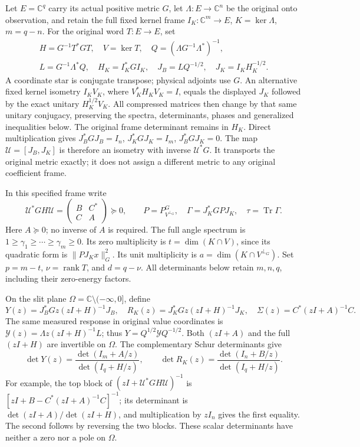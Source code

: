 \documentclass[10pt]{article}
\begin{document}
Let \(E=\mathbb C^q\) carry its actual positive metric \(G\), let \(\Lambda:E\to\mathbb C^n\) be the original onto observation, and retain the full fixed kernel frame \(I_K:\mathbb C^m\to E\), \(K=\ker\Lambda\), \(m=q-n\). For the original word \(T:E\to E\), set \[
\begin{gathered}
 H=G^{-1}T^*GT,\quad V=\ker T,\quad Q=(\Lambda G^{-1}\Lambda^*)^{-1},\\
 L=G^{-1}\Lambda^*Q,\quad H_K=I_K^*GI_K,\quad
 J_B=LQ^{-1/2},\quad J_K=I_KH_K^{-1/2}.
 \end{gathered}
 \tag{SF1}
\] A coordinate star is conjugate transpose; physical adjoints use \(G\). An alternative fixed kernel isometry \(I_KV_K\), where \(V_K^*H_KV_K=I\), equals the displayed \(J_K\) followed by the exact unitary \(H_K^{1/2}V_K\). All compressed matrices then change by that same unitary conjugacy, preserving the spectra, determinants, phases and generalized inequalities below. The original frame determinant remains in \(H_K\). Direct multiplication gives \(J_B^*GJ_B=I_n\), \(J_K^*GJ_K=I_m\), \(J_B^*GJ_K=0\). The map \(\mathcal U=[J_B,J_K]\) is therefore an isometry with inverse \(\mathcal U^*G\). It transports the original metric exactly; it does not assign a different metric to any original coefficient frame.

In this specified frame write \[
 \mathcal U^*GH\mathcal U=
 \begin{pmatrix}B&C^*\\ C&A\end{pmatrix}\succeq0,\qquad
 P=P_{V^{\perp_G}}^G,\quad \Gamma=J_K^*GPJ_K,\quad \tau=\operatorname{Tr}\Gamma.
 \tag{SF2}
\] Here \(A\succeq0\); no inverse of \(A\) is required. The full angle spectrum is \(1\ge\gamma_1\ge\cdots\ge\gamma_m\ge0\). Its zero multiplicity is \(t=\dim(K\cap V)\), since its quadratic form is \(\|PJ_Kx\|_G^2\). Its unit multiplicity is \(a=\dim(K\cap V^{\perp_G})\). Set \(p=m-t\), \(\nu=\operatorname{rank}T\), and \(d=q-\nu\). All determinants below retain \(m,n,q\), including their zero-energy factors.

On the slit plane \(\Omega=\mathbb C\setminus(-\infty,0]\), define \[
 Y(z)=J_B^*Gz(zI+H)^{-1}J_B,\quad
 R_K(z)=J_K^*Gz(zI+H)^{-1}J_K,\quad
 \Sigma(z)=C^*(zI+A)^{-1}C .
 \tag{SF3}
\] The same measured response in original value coordinates is \(\mathscr Y(z)=\Lambda z(zI+H)^{-1}L\); thus \(Y=Q^{1/2}\mathscr YQ^{-1/2}\). Both \((zI+A)\) and the full \((zI+H)\) are invertible on \(\Omega\). The complementary Schur determinants give \[
 \det Y(z)=\frac{\det(I_m+A/z)}{\det(I_q+H/z)},\qquad
 \det R_K(z)=\frac{\det(I_n+B/z)}{\det(I_q+H/z)}.
 \tag{SF4}
\] For example, the top block of \((zI+\mathcal U^*GH\mathcal U)^{-1}\) is \([zI+B-C^*(zI+A)^{-1}C]^{-1}\); its determinant is \(\det(zI+A)/\det(zI+H)\), and multiplication by \(zI_n\) gives the first equality. The second follows by reversing the two blocks. These scalar determinants have neither a zero nor a pole on \(\Omega\).
\end{document}
